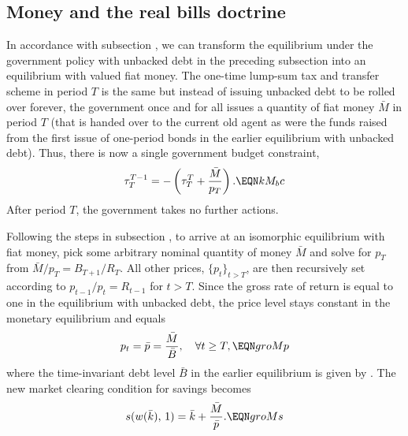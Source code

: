 \subsection{Money and the real bills doctrine}

In accordance with subsection ,
we can transform the equilibrium
under the government policy with unbacked debt in the
preceding subsection into an equilibrium with
valued fiat money. The one-time lump-sum tax and
transfer scheme in period $T$ is the same but instead 
of issuing unbacked debt to be rolled over forever, 
the government once and for all issues a quantity of 
fiat money $\bar M$ in period $T$ (that is handed over
to the current old agent as were the funds
raised from the first issue of one-period bonds in 
the earlier equilibrium with unbacked debt). Thus, there
is now a single government budget constraint,  
$$\tau^{T-1}_T = -\left( \tau^T_T + {\bar M \over p_T} \right).
                                              \EQN kM_bc
$$
After period $T$, the government takes no further actions.

Following the steps in subsection ,
to arrive at an isomorphic equilibrium with
fiat money, pick some arbitrary nominal 
quantity of money $\bar M$ and solve for
$p_T$ from $\bar M/p_T=B_{T+1}/R_T$. All
other prices, $\{p_t\}_{t>T}$, are then
recursively set according to 
$p_{t-1}/p_t=R_{t-1}$ for $t>T$. Since the
gross rate of return is equal to one in
the equilibrium with unbacked debt, the
price level stays constant in the monetary 
equilibrium and equals
$$
p_t = \bar p = {\bar M \over \bar B}, 
\quad \forall t\geq T,           \EQN groMp
$$
where the time-invariant debt level $\bar B$ in the
earlier equilibrium is given by . The
new market clearing condition for savings
becomes
$$ s(w(\bar k),\, 1)
        = \bar k + {\bar M \over \bar p}. \EQN groMs
$$

